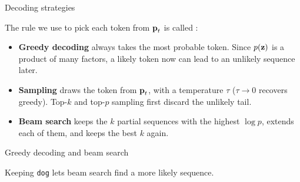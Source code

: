 \begin{frame}{Decoding strategies}
    \setlength{\parskip}{4pt}

    The rule we use to pick each token from $\boldsymbol{\mathbf{p}}_t$ is called
    :
    \begin{itemize}
        \item \textbf{Greedy decoding} always takes the most probable token.
              Since $p(\boldsymbol{\mathbf{z}})$ is a product of many factors, a likely token now
              can lead to an unlikely sequence later.
        \item \textbf{Sampling} draws the token from $\boldsymbol{\mathbf{p}}_t$, with a
              temperature $\tau$ ($\tau\to0$ recovers greedy). Top-$k$ and
              top-$p$ sampling first discard the unlikely tail.
        \item \textbf{Beam search} keeps the $k$ partial sequences with the
              highest $\log p$, extends each of them, and keeps the best $k$
              again.
    \end{itemize}


\end{frame}

\begin{whiteframe}{Greedy decoding and beam search}

    \begin{center}
        
    \end{center}

    \vspace{0.6em}
    Keeping \texttt{dog} lets beam search find a more likely sequence.

\end{whiteframe}
